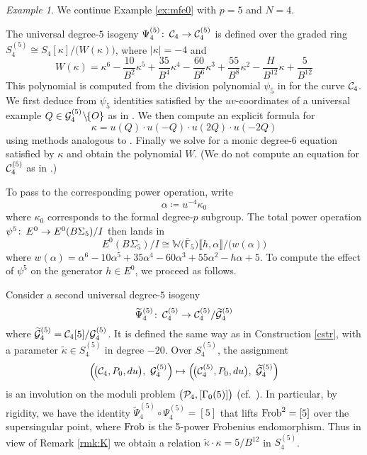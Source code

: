 \documentclass{gtpart}
\theoremstyle{definition}
\theoremstyle{remark}
\newtheorem{ex}[thm]{Example}
\def\co{\colon\thinspace}
\newcommand{\mb}[1]{\mathbb{#1}}
\newcommand{\cF}{\overline {\mb F}}
\newcommand{\CC}{{\cal C}}
\newcommand{\CG}{{\cal G}}
\newcommand{\CP}{{\cal P}}
\newcommand{\Frob}{{\rm Frob}}
\newcommand{\BW}{{\mb W}}
\newcommand{\A}{\alpha}
\newcommand{\G}{\Gamma}
\newcommand{\K}{\kappa}
\newcommand{\ce}{\coloneqq}
\newcommand{\lb}{\llbracket}
\newcommand{\rb}{\rrbracket}
\renewcommand{\=}{\approx}
\renewcommand{\-}{\sim}
\numberwithin{equation}{section}
\numberwithin{thm}{section}
\begin{document}
\begin{ex}
 \label{ex:po}
 We continue Example \ref{ex:mfe0} with $p = 5$ and $N = 4$.  

 The universal degree-$5$ isogeny $\Psi_4^{(5)} \co \CC_4 \to \CC_4^{(5)}$ is defined over the graded ring $S_4^{(5)} \cong S_4[\K] / \big(W(\K)\big)$, 
 where $|\K| = -4$ and 
 \begin{equation}
  \label{W}
  W(\K) = \K^6 - \frac{10}{B^2} \K^5 + \frac{35}{B^4} \K^4 - \frac{60}{B^6} \K^3 + \frac{55}{B^8} \K^2 - \frac{H}{B^{12}} \K + \frac{5}{B^{12}} 
 \end{equation}
 This polynomial is computed from the division polynomial $\psi_5$ in \cite[Exercise 3.7]{AEC} for the curve $\CC_4$.  
 We first deduce from $\psi_5$ identities satisfied by the $uv$-coordinates of a universal example 
 $Q \in \CG_4^{(5)} \!\setminus\!\! \{O\}$ as in \cite[proof of Proposition 2.2]{p3}.  
 We then compute an explicit formula for 
 \[
  \K = u(Q) \cdot u(-Q) \cdot u(2 Q) \cdot u(-2 Q) 
 \]
 using methods analogous to \cite[III.2.3]{AEC}.  
 Finally we solve for a monic degree-6 equation satisfied by $\K$ and obtain the polynomial $W$.  
 (We do not compute an equation for $\CC_4^{(5)}$ as in \cite[Proposition 2.3]{p3}.)  

 To pass to the corresponding power operation, write 
 \[
  \A \ce u^{-4} \K_0 
 \]
 where $\K_0$ corresponds to the formal degree-$p$ subgroup.  
 The total power operation $\psi^5 \co E^0 \to E^0(B\Sigma_5) / I$ then lands in 
 \[
  E^0(B\Sigma_5) / I \cong \BW \big( \cF_5 \big) \lb h, \A \rb / \big(w(\A)\big) 
 \]
 where $w(\A) = \A^6 - 10 \A^5 + 35 \A^4 - 60 \A^3 + 55 \A^2 - h \A + 5$.  
 To compute the effect of $\psi^5$ on the generator $h \in E^0$, we proceed as follows.  

 Consider a second universal degree-$5$ isogeny 
 \[
  \widetilde{\Psi}_4^{(5)} \co \CC_4^{(5)} \to \CC_4^{(5)} / \widetilde{\CG}_4^{(5)} 
 \]
 where $\widetilde{\CG}_4^{(5)} = \CC_4[5] / \CG_4^{(5)}$.  
 It is defined the same way as in Construction \ref{cstr}, 
 with a parameter $\widetilde{\K} \in S_4^{(5)}$ in degree $-20$.  
 Over $S_4^{(5)}$, the assignment 
 \[
  \left(\! \big( \CC_4, P_0, du \big), ~ \CG_4^{(5)} \right) \mapsto \left(\! \big( \CC_4^{(5)}, P_0, du \big), ~ \widetilde{\CG}_4^{(5)} \right) 
 \]
 is an involution on the moduli problem $\big(\CP_4,[\G_0(5)]\big)$ (cf.~\cite[11.3.1]{KM}).  In particular, 
 by rigidity, we have the identity $\widetilde{\Psi}_4^{(5)} \circ \Psi_4^{(5)} = [5]$ that lifts $\Frob^2 = [5]$ over the supersingular point, 
 where $\Frob$ is the 5-power Frobenius endomorphism.  
 Thus in view of Remark \ref{rmk:K} we obtain a relation $\widetilde{\K} \cdot \K = 5 / B^{12}$ in $S_4^{(5)}$.  


\end{ex}
\end{document}
